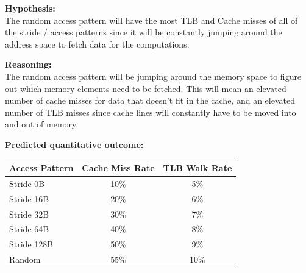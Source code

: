 \documentclass[11pt]{article}
\begin{document}
\begin{hypothesisbox}
	\textbf{Hypothesis:} \\

	The random access pattern will have the most TLB and Cache misses of all of the stride / access patterns since it will
	be constantly jumping around the address space to fetch data for the computations.

	\textbf{Reasoning:} \\

	The random access pattern will be jumping around the memory space to figure out which memory elements need to be
	fetched. This will mean an elevated number of cache misses for data that doesn't fit in the cache, and an elevated
	number of TLB misses since cache lines will constantly have to be moved into and out of memory.

	\textbf{Predicted quantitative outcome:} \\
	\begin{center}
		\label{tab:hypothesis-simd}
		\begin{tabular}{lcc}
			\toprule
			\textbf{Access Pattern} & \textbf{Cache Miss Rate} & \textbf{TLB Walk Rate} \\
			\midrule
			Stride 0B               & 10\%                     & 5\%                    \\
			Stride 16B              & 20\%                     & 6\%                    \\
			Stride 32B              & 30\%                     & 7\%                    \\
			Stride 64B              & 40\%                     & 8\%                    \\
			Stride 128B             & 50\%                     & 9\%                    \\
			Random                  & 55\%                     & 10\%                   \\
			\bottomrule
		\end{tabular}
	\end{center}
\end{hypothesisbox}

\end{document}
